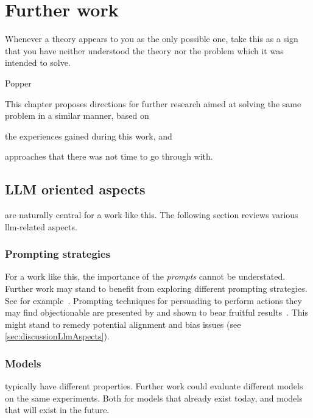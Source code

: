 \chapter{Further work}\label{chp:furtherWork}

\epigraph{Whenever a theory appears to you as the only possible one, take this as a sign that you have neither understood the theory nor the problem which it was intended to solve.}{Popper}

This chapter proposes directions for further research aimed at solving the same problem in a similar
manner, based on \begin{inparaenum}
    \item the experiences gained during this work, and
    \item approaches that there was not time to go through with.
\end{inparaenum}

\section{LLM oriented aspects}\label{sec:fwLlm}

 are naturally central for a work like this. The following
section reviews various \acrshort{llm}-related aspects.

\subsection{Prompting strategies}

For a work like this, the importance of the \emph{prompts} cannot be understated. Further work may
stand to benefit from exploring different prompting strategies. See for
example~\cite{girayPromptEngineering23}. Prompting techniques for persuading  to
perform actions they may find objectionable are presented by \citeauthor{meincke2025overtale} and
shown to bear fruitful results~\cite[1]{meincke2025overtale}. This might stand to remedy potential
alignment and bias issues (see \cref{sec:discussionLlmAspects}).

\subsection{Models}

 typically have different properties. Further work could evaluate different models
on the same experiments. Both for models that already exist today, and models that will exist in the future.

